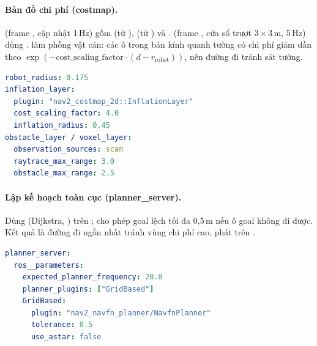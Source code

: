\paragraph{Bản đồ chi phí (costmap).}  (frame , cập nhật 1\,Hz) gồm  (từ ),
 (từ ) và .  (frame , cửa sổ trượt $3\times 3$\,m, 5\,Hz) dùng
.  làm phồng vật cản: các ô trong bán kính  quanh tường có chi phí giảm dần
theo $\exp(-\text{cost\_scaling\_factor}\cdot(d-r_{\text{robot}}))$, nên đường đi tránh sát tường.
\begin{lstlisting}[language=yaml,caption={Trích \file{config/nav2.yaml}: costmap.}]
robot_radius: 0.175
inflation_layer:
  plugin: "nav2_costmap_2d::InflationLayer"
  cost_scaling_factor: 4.0
  inflation_radius: 0.45
obstacle_layer / voxel_layer:
  observation_sources: scan
  raytrace_max_range: 3.0
  obstacle_max_range: 2.5
\end{lstlisting}

\paragraph{Lập kế hoạch toàn cục (planner\_server).} Dùng  (Dijkstra, ) trên ;
 cho phép goal lệch tối đa 0,5\,m nếu ô goal không đi được. Kết quả là đường đi ngắn nhất tránh vùng chi phí cao, phát trên .
\begin{lstlisting}[language=yaml,caption={Trích \file{config/nav2.yaml}: planner.}]
planner_server:
  ros__parameters:
    expected_planner_frequency: 20.0
    planner_plugins: ["GridBased"]
    GridBased:
      plugin: "nav2_navfn_planner/NavfnPlanner"
      tolerance: 0.5
      use_astar: false
\end{lstlisting}

